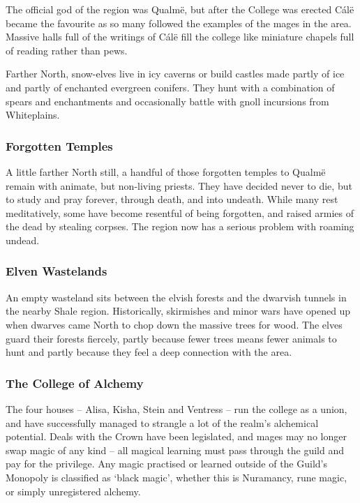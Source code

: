 \begin{multicols}{2}
The official god of the region was Qualm\"{e}, but after the College was erected C\'{a}l\"{e} became the favourite as so many followed the examples of the mages in the area.
Massive halls full of the writings of C\'{a}l\"{e} fill the college like miniature chapels full of reading rather than pews.

Farther North, snow-elves live in icy caverns or build castles made partly of ice and partly of enchanted evergreen conifers.
They hunt with a combination of spears and enchantments and occasionally battle with gnoll incursions from Whiteplains.

\subsubsection{Forgotten Temples}

A little farther North still, a handful of those forgotten temples to Qualm\"{e} remain with animate, but non-living priests.
They have decided never to die, but to study and pray forever, through death, and into undeath.
While many rest meditatively, some have become resentful of being forgotten, and raised armies of the dead by stealing corpses.
The region now has a serious problem with roaming undead.

\subsubsection{Elven Wastelands}

An empty wasteland sits between the elvish forests and the dwarvish tunnels in the nearby Shale region.
Historically, skirmishes and minor wars have opened up when dwarves came North to chop down the massive trees for wood.
The elves guard their forests fiercely, partly because fewer trees means fewer animals to hunt and partly because they feel a deep connection with the area.

\subsubsection{The College of Alchemy}

The four houses -- Alisa, Kisha, Stein and Ventress -- run the college as a union, and have successfully managed to strangle a lot of the realm's alchemical potential.
Deals with the Crown have been legislated, and mages may no longer swap magic of any kind -- all magical learning must pass through the guild and pay for the privilege.
Any magic practised or learned outside of the Guild's Monopoly is classified as `black magic', whether this is Nuramancy, rune magic, or simply unregistered alchemy.


\end{multicols}
